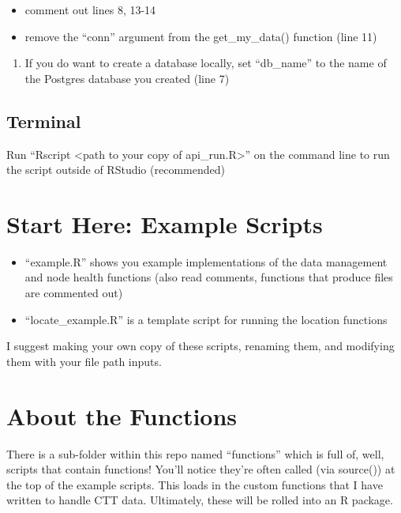 \documentclass[
]{book}
\providecommand{\tightlist}{%
  \setlength{\itemsep}{0pt}\setlength{\parskip}{0pt}}
\begin{document}
\begin{itemize}
\tightlist
\item
  comment out lines 8, 13-14
\item
  remove the ``conn'' argument from the get\_my\_data() function (line 11)
\end{itemize}

\begin{enumerate}
\def\labelenumi{\arabic{enumi}.}
\setcounter{enumi}{4}
\tightlist
\item
  If you do want to create a database locally, set ``db\_name'' to the name of the Postgres database you created (line 7)
\end{enumerate}

\hypertarget{terminal}{%
\section{Terminal}\label{terminal}}

Run ``Rscript \textless path to your copy of api\_run.R\textgreater{}'' on the command line to run the script outside of RStudio (recommended)

\hypertarget{start-here-example-scripts}{%
\chapter{Start Here: Example Scripts}\label{start-here-example-scripts}}

\begin{itemize}
\tightlist
\item
  ``example.R'' shows you example implementations of the data management and node health functions (also read comments, functions that produce files are commented out)
\item
  ``locate\_example.R'' is a template script for running the location functions
\end{itemize}

I suggest making your own copy of these scripts, renaming them, and modifying them with your file path inputs.

\hypertarget{about-the-functions}{%
\chapter{About the Functions}\label{about-the-functions}}

There is a sub-folder within this repo named ``functions'' which is full of, well, scripts that contain functions! You'll notice they're often called (via source()) at the top of the example scripts. This loads in the custom functions that I have written to handle CTT data. Ultimately, these will be rolled into an R package.
\end{document}
